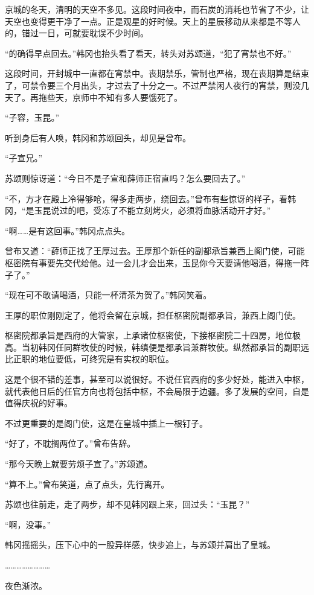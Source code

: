 京城的冬天，清明的天空不多见。这段时间夜中，而石炭的消耗也节省了不少，让天空也变得更干净了一点。正是观星的好时候。天上的星辰移动从来都是不等人的，错过一日，可就要耽误不少时间。

“的确得早点回去。”韩冈也抬头看了看天，转头对苏颂道，“犯了宵禁也不好。”

这段时间，开封城中一直都在宵禁中。丧期禁乐，管制也严格，现在丧期算是结束了，可禁令要三个月出头，才过去了十分之一。不过严禁闲人夜行的宵禁，则没几天了。再拖些天，京师中不知有多人要饿死了。

“子容，玉昆。”

听到身后有人唤，韩冈和苏颂回头，却见是曾布。

“子宣兄。”

苏颂则惊讶道：“今日不是子宣和薛师正宿直吗？怎么要回去了。”

“不，方才在殿上冷得够呛，得多走两步，绕回去。”曾布有些惊讶的样子，看韩冈，“是玉昆说过的吧，受冻了不能立刻烤火，必须将血脉活动开才好。”

“啊……是有这回事。”韩冈点点头。

曾布又道：“薛师正找了王厚过去。王厚那个新任的副都承旨兼西上阁门使，可能枢密院有事要先交代给他。过一会儿才会出来，玉昆你今天要请他喝酒，得拖一阵子了。”

“现在可不敢请喝酒，只能一杯清茶为贺了。”韩冈笑着。

王厚的职位刚刚定了，他将会留在京城，担任枢密院副都承旨，兼西上阁门使。

枢密院都承旨是西府的大管家，上承诸位枢密使，下接枢密院二十四房，地位极高。当初韩冈任同群牧使的时候，韩缜便是都承旨兼群牧使。纵然都承旨的副职远比正职的地位要低，可终究是有实权的职位。

这是个很不错的差事，甚至可以说很好。不说任官西府的多少好处，能进入中枢，就代表他日后的任官方向也将包括中枢，不会局限于边疆。多了发展的空间，自是值得庆祝的好事。

不过更重要的是阁门使，这是在皇城中插上一根钉子。

“好了，不耽搁两位了。”曾布告辞。

“那今天晚上就要劳烦子宣了。”苏颂道。

“算不上。”曾布笑道，点了点头，先行离开。

苏颂也往前走，走了两步，却不见韩冈跟上来，回过头：“玉昆？”

“啊，没事。”

韩冈摇摇头，压下心中的一股异样感，快步追上，与苏颂并肩出了皇城。

……………………

夜色渐浓。

